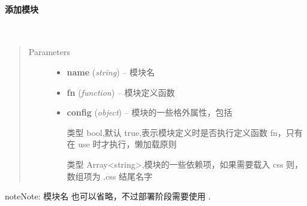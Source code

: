\documentclass[letterpaper,10pt,english]{sphinxmanual}
\begin{document}
\paragraph{添加模块}
\label{api/seed/loader/add.ver1.2:id1}

\begin{fulllineitems}
\label{api/seed/loader/add.ver1.2:Loader.KISSY.add}~\begin{quote}\begin{description}
\item[{Parameters}] \leavevmode\begin{itemize}
\item {}
\textbf{name} (\emph{string}) -- 模块名

\item {}
\textbf{fn} (\emph{function}) -- 模块定义函数

\item {}
\textbf{config} (\emph{object}) --
模块的一些格外属性，包括


\begin{fulllineitems}
\label{api/seed/loader/add.ver1.2:Loader.config.attach}
类型 bool,默认 true,表示模块定义时是否执行定义函数 fn，只有在 use 时才执行，懒加载原则

\end{fulllineitems}



\begin{fulllineitems}
\label{api/seed/loader/add.ver1.2:Loader.config.requires}
类型 Array\textless{}string\textgreater{},模块的一些依赖项，如果需要载入 css 则，数组项为 .css 结尾名字

\end{fulllineitems}



\end{itemize}

\end{description}\end{quote}

\end{fulllineitems}


\begin{notice}{note}{Note:}
模块名  也可以省略，不过部署阶段需要使用 {\hyperref[tools/module-compiler/index:module-module-compiler]{}} .
\end{notice}
\end{document}
